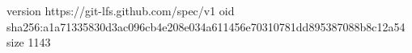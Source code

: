 version https://git-lfs.github.com/spec/v1
oid sha256:a1a71335830d3ac096cb4e208e034a611456e70310781dd895387088b8c12a54
size 1143
